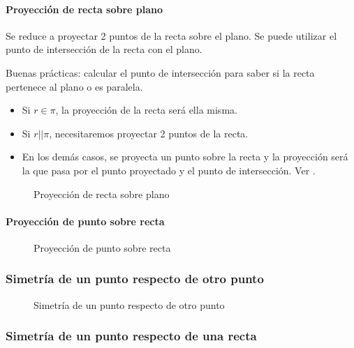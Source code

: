\paragraph{Proyección de recta sobre plano}

Se reduce a proyectar 2 puntos de la recta sobre el plano. Se puede utilizar el punto de intersección de la recta con el plano.

\obs Buenas prácticas: calcular el punto de intersección para saber si la recta pertenece al plano o es paralela. 
\begin{itemize}
  \item Si $r\in\pi$, la proyección de la recta será ella misma.
  \item Si $r||\pi$, necesitaremos proyectar 2 puntos de la recta.
  \item En los demás casos, se proyecta un punto sobre la recta y la proyección será la que pasa por el punto proyectado y el punto de intersección. Ver .
\end{itemize}


\begin{figure}[hbtp]
\centering
{}

\label{fig::proy::recta-plano}
\caption{Proyección de recta sobre plano}
\end{figure}


\paragraph{Proyección de punto sobre recta}


\begin{figure}[hbtp]
\centering
{}

\label{fig::proy::punto-recta}
\caption{Proyección de punto sobre recta}
\end{figure}


\subsubsection{Simetría de un punto respecto de otro punto}

\begin{figure}[hbtp]
\centering
{}

\label{fig::sim::punto-punto}
\caption{Simetría de un punto respecto de otro punto}
\end{figure}

\subsubsection{Simetría de un punto respecto de una recta}

